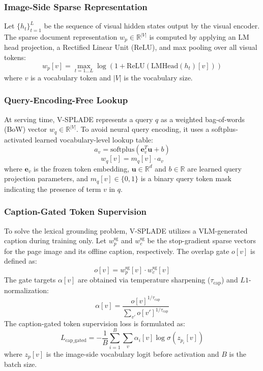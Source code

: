 \documentclass[11pt,a4paper]{article}
\begin{document}
\subsubsection{Image-Side Sparse Representation}
Let $\{h_t\}_{t=1}^L$ be the sequence of visual hidden states output by the visual encoder. The sparse document representation $w_p \in \mathbb{R}^{|V|}$ is computed by applying an LM head projection, a Rectified Linear Unit (ReLU), and max pooling over all visual tokens:
\begin{equation}
w_p[v] = \max_{t=1 \dots L} \log(1 + \text{ReLU}(\text{LMHead}(h_t)[v]))
\end{equation}
where $v$ is a vocabulary token and $|V|$ is the vocabulary size.

\subsubsection{Query-Encoding-Free Lookup}
At serving time, V-SPLADE represents a query $q$ as a weighted bag-of-words (BoW) vector $w_q \in \mathbb{R}^{|V|}$. To avoid neural query encoding, it uses a softplus-activated learned vocabulary-level lookup table:
\begin{equation}
a_v = \text{softplus}(\bm{e}_v^T \bm{u} + b)
\end{equation}
\begin{equation}
w_q[v] = m_q[v] \cdot a_v
\end{equation}
where $\bm{e}_v$ is the frozen token embedding, $\bm{u} \in \mathbb{R}^d$ and $b \in \mathbb{R}$ are learned query projection parameters, and $m_q[v] \in \{0, 1\}$ is a binary query token mask indicating the presence of term $v$ in $q$. 

\subsubsection{Caption-Gated Token Supervision}
To solve the lexical grounding problem, V-SPLADE utilizes a VLM-generated caption during training only. Let $w_p^{\text{sg}}$ and $w_c^{\text{sg}}$ be the stop-gradient sparse vectors for the page image and its offline caption, respectively. The overlap gate $o[v]$ is defined as:
\begin{equation}
o[v] = w_p^{\text{sg}}[v] \cdot w_c^{\text{sg}}[v]
\end{equation}
The gate targets $\alpha[v]$ are obtained via temperature sharpening ($\tau_{\text{cap}}$) and $L1$-normalization:
\begin{equation}
\alpha[v] = \frac{o[v]^{1/\tau_{\text{cap}}}}{\sum_{v'} o[v']^{1/\tau_{\text{cap}}}}
\end{equation}
The caption-gated token supervision loss is formulated as:
\begin{equation}
L_{\text{cap\_gated}} = -\frac{1}{B} \sum_{i=1}^B \sum_v \alpha_i[v] \log \sigma(z_{p_i}[v])
\end{equation}
where $z_p[v]$ is the image-side vocabulary logit before activation and $B$ is the batch size. 
\end{document}
